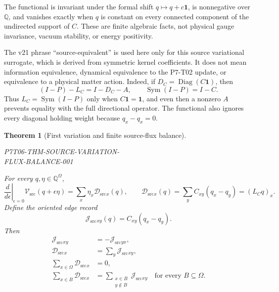 \documentclass[11pt]{article}
\newtheorem{theorem}{Theorem}
\newcommand{\Q}{\mathbb Q}
\newcommand{\Vsrc}{\mathcal V_{\mathrm{src}}}
\newcommand{\Dsrc}{\mathcal D_{\mathrm{src}}}
\newcommand{\Jsrc}{\mathcal J_{\mathrm{src}}}
\newcommand{\One}{\mathbf 1}
\begin{document}
The functional is invariant under the formal shift
\(q\mapsto q+c\One\), is nonnegative over \(\Q\), and vanishes exactly when
\(q\) is constant on every connected component of the undirected support of
\(C\).  These are finite algebraic facts, not physical gauge invariance,
vacuum stability, or energy positivity.

The v21 phrase ``source-equivalent'' is used here only for this source
variational surrogate, which is derived from symmetric kernel coefficients.
It does not mean information equivalence, dynamical equivalence to the P7-T02
update, or equivalence to a physical matter action.  Indeed, if
\(D_C=\operatorname{Diag}(C\One)\), then
\begin{equation}
 (I-P)-L_C=I-D_C-A,
 \qquad
 \operatorname{Sym}(I-P)=I-C.
 \label{eq:information-loss}
\end{equation}
Thus \(L_C=\operatorname{Sym}(I-P)\) only when \(C\One=\One\), and even then
a nonzero \(A\) prevents equality with the full directional operator.  The
functional also ignores every diagonal holding weight because
\(q_x-q_x=0\).

\begin{theorem}[First variation and finite source-flux balance]
\label{thm:variation}
\begin{center}
\normalfont\small\ttfamily
P7T06-THM-SOURCE-VARIATION-\\
FLUX-BALANCE-001
\end{center}
For every \(q,\eta\in\Q^\Omega\),
\begin{equation}
 \left.\frac{d}{d\epsilon}\right|_{\epsilon=0}
 \Vsrc(q+\epsilon\eta)
 =
 \sum_x\eta_x\Dsrc{}_{x}(q),
 \qquad
 \Dsrc{}_{x}(q)
 =
 \sum_yC_{xy}(q_x-q_y)
 =
 (L_Cq)_x.
 \label{eq:first-variation}
\end{equation}
Define the oriented edge record
\begin{equation}
 \Jsrc{}_{xy}(q)=C_{xy}(q_x-q_y).
 \label{eq:flux}
\end{equation}
Then
\begin{align}
 \Jsrc{}_{xy}&=-\Jsrc{}_{yx},                                  \label{eq:antisym}\\
 \Dsrc{}_{x}&=\sum_y\Jsrc{}_{xy},                              \label{eq:divergence}\\
 \sum_{x\in\Omega}\Dsrc{}_{x}&=0,                              \label{eq:closed}\\
 \sum_{x\in B}\Dsrc{}_{x}
 &=\sum_{\substack{x\in B\\y\notin B}}\Jsrc{}_{xy}
 \quad\text{for every }B\subseteq\Omega.                       \label{eq:boundary}
\end{align}
\end{theorem}
\end{document}

